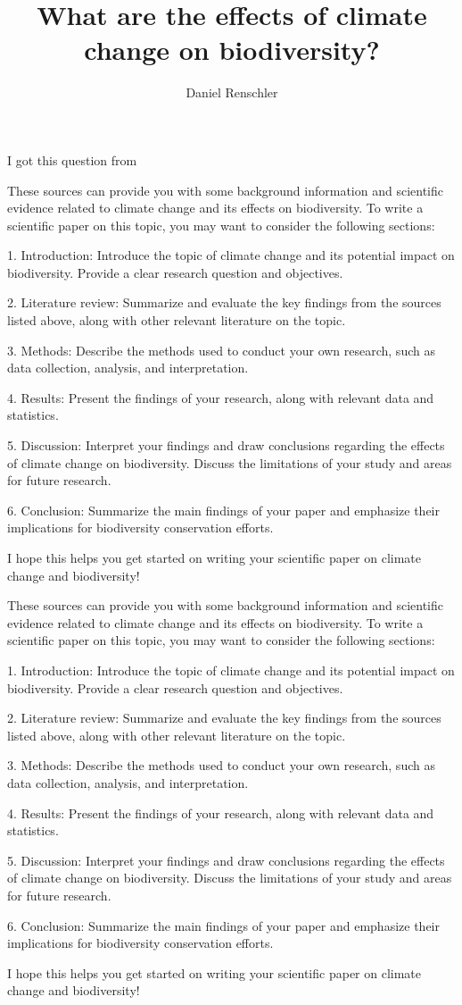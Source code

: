 \documentclass{article}
\title{What are the effects of climate change on biodiversity?}
\author{Daniel Renschler}
\begin{document}
I got this question from~\cite{chatgpt}

These sources can provide you with some background information and scientific
evidence related to climate change and its effects on biodiversity. To write a
scientific paper on this topic, you may want to consider the following
sections:

1. Introduction: Introduce the topic of climate change and its potential impact
  on biodiversity. Provide a clear research question and objectives.

2. Literature review: Summarize and evaluate the key findings from the sources
  listed above, along with other relevant literature on the topic.

3. Methods: Describe the methods used to conduct your own research, such as
  data collection, analysis, and interpretation.

4. Results: Present the findings of your research, along with relevant data and
  statistics.

5. Discussion: Interpret your findings and draw conclusions regarding the
  effects of climate change on biodiversity. Discuss the limitations of your
  study and areas for future research.

6. Conclusion: Summarize the main findings of your paper and emphasize their
  implications for biodiversity conservation efforts.

I hope this helps you get started on writing your scientific paper on climate
change and biodiversity!

These sources can provide you with some background information and scientific
evidence related to climate change and its effects on biodiversity. To write a
scientific paper on this topic, you may want to consider the following
sections:

1. Introduction: Introduce the topic of climate change and its potential impact
  on biodiversity. Provide a clear research question and objectives.

2. Literature review: Summarize and evaluate the key findings from the sources
  listed above, along with other relevant literature on the topic.

3. Methods: Describe the methods used to conduct your own research, such as
  data collection, analysis, and interpretation.

4. Results: Present the findings of your research, along with relevant data and
  statistics.

5. Discussion: Interpret your findings and draw conclusions regarding the
  effects of climate change on biodiversity. Discuss the limitations of your
  study and areas for future research.

6. Conclusion: Summarize the main findings of your paper and emphasize their
  implications for biodiversity conservation efforts.

I hope this helps you get started on writing your scientific paper on climate
change and biodiversity!

\printbibliography
\end{document}
